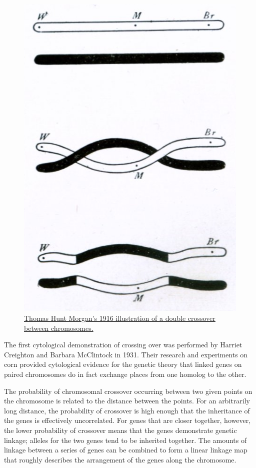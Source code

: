 \begin{figure}

{\centering \includegraphics[width=0.7\linewidth]{./figures/genetics/Morgan_crossover_2_cropped} 

}

\caption{\href{https://commons.wikimedia.org/wiki/File:Morgan_crossover_2_cropped.png}{Thomas Hunt Morgan's 1916 illustration of a double crossover between chromosomes.}}\label{fig:crossingover}
\end{figure}

The first cytological demonstration of crossing over was performed by Harriet Creighton and Barbara McClintock in 1931. Their research and experiments on corn provided cytological evidence for the genetic theory that linked genes on paired chromosomes do in fact exchange places from one homolog to the other.

The probability of chromosomal crossover occurring between two given points on the chromosome is related to the distance between the points. For an arbitrarily long distance, the probability of crossover is high enough that the inheritance of the genes is effectively uncorrelated. For genes that are closer together, however, the lower probability of crossover means that the genes demonstrate genetic linkage; alleles for the two genes tend to be inherited together. The amounts of linkage between a series of genes can be combined to form a linear linkage map that roughly describes the arrangement of the genes along the chromosome.

